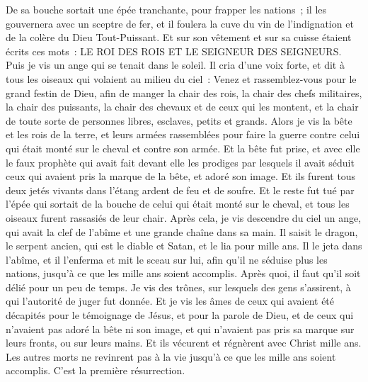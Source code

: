 \begin{multicols}{2}
De sa bouche sortait une épée tranchante, pour frapper les nations~; il les gouvernera avec un sceptre de fer, et il foulera la cuve du vin de l'indignation et de la colère du Dieu Tout-Puissant.
Et sur son vêtement et sur sa cuisse étaient écrits ces mots~: LE ROI DES ROIS ET LE SEIGNEUR DES SEIGNEURS.
Puis je vis un ange qui se tenait dans le soleil. Il cria d'une voix forte, et dit à tous les oiseaux qui volaient au milieu du ciel~: Venez et rassemblez-vous pour le grand festin de Dieu,
afin de manger la chair des rois, la chair des chefs militaires, la chair des puissants, la chair des chevaux et de ceux qui les montent, et la chair de toute sorte de personnes libres, esclaves, petits et grands.
Alors je vis la bête et les rois de la terre, et leurs armées rassemblées pour faire la guerre contre celui qui était monté sur le cheval et contre son armée.
Et la bête fut prise, et avec elle le faux prophète qui avait fait devant elle les prodiges par lesquels il avait séduit ceux qui avaient pris la marque de la bête, et adoré son image. Et ils furent tous deux jetés vivants dans l'étang ardent de feu et de soufre.
Et le reste fut tué par l'épée qui sortait de la bouche de celui qui était monté sur le cheval, et tous les oiseaux furent rassasiés de leur chair.
\VerseOne{}Après cela, je vis descendre du ciel un ange, qui avait la clef de l'abîme et une grande chaîne dans sa main.
Il saisit le dragon, le serpent ancien, qui est le diable et Satan, et le lia pour mille ans.
Il le jeta dans l'abîme, et il l'enferma et mit le sceau sur lui, afin qu'il ne séduise plus les nations, jusqu'à ce que les mille ans soient accomplis. Après quoi, il faut qu'il soit délié pour un peu de temps.
Je vis des trônes, sur lesquels des gens s'assirent, à qui l'autorité de juger fut donnée. Et je vis les âmes de ceux qui avaient été décapités pour le témoignage de Jésus, et pour la parole de Dieu, et de ceux qui n'avaient pas adoré la bête ni son image, et qui n'avaient pas pris sa marque sur leurs fronts, ou sur leurs mains. Et ils vécurent et régnèrent avec Christ mille ans.
Les autres morts ne revinrent pas à la vie jusqu'à ce que les mille ans soient accomplis. C'est la première résurrection.

\end{multicols}
